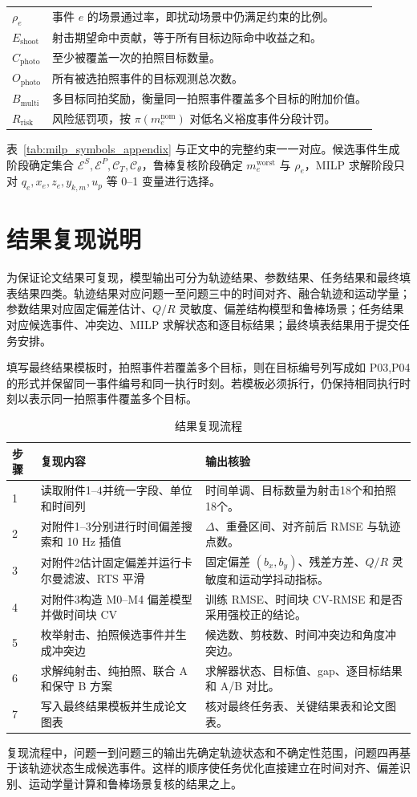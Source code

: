 \documentclass{cumcmthesis}
\begin{document}
\begin{longtable}{p{}p{}}
  $\rho_e$ & 事件 $e$ 的场景通过率，即扰动场景中仍满足约束的比例。\\
  $E_{\mathrm{shoot}}$ & 射击期望命中贡献，等于所有目标边际命中收益之和。\\
  $C_{\mathrm{photo}}$ & 至少被覆盖一次的拍照目标数量。\\
  $O_{\mathrm{photo}}$ & 所有被选拍照事件的目标观测总次数。\\
  $B_{\mathrm{multi}}$ & 多目标同拍奖励，衡量同一拍照事件覆盖多个目标的附加价值。\\
  $R_{\mathrm{risk}}$ & 风险惩罚项，按 $\pi(m_e^{\mathrm{nom}})$ 对低名义裕度事件分段计罚。\\
  \bottomrule
\end{longtable}

表~\ref{tab:milp_symbols_appendix} 与正文中的完整约束一一对应。候选事件生成阶段确定集合 $\mathcal E^S,\mathcal E^P,\mathcal C_T,\mathcal C_\theta$，鲁棒复核阶段确定 $m_e^{\mathrm{worst}}$ 与 $\rho_e$，MILP 求解阶段只对 $q_e,x_e,z_e,y_{k,m},u_p$ 等 0--1 变量进行选择。

\section{结果复现说明}
为保证论文结果可复现，模型输出可分为轨迹结果、参数结果、任务结果和最终填表结果四类。轨迹结果对应问题一至问题三中的时间对齐、融合轨迹和运动学量；参数结果对应固定偏差估计、$Q/R$ 灵敏度、偏差结构模型和鲁棒场景；任务结果对应候选事件、冲突边、MILP 求解状态和逐目标结果；最终填表结果用于提交任务安排。

填写最终结果模板时，拍照事件若覆盖多个目标，则在目标编号列写成如 P03,P04 的形式并保留同一事件编号和同一执行时刻。若模板必须拆行，仍保持相同执行时刻以表示同一拍照事件覆盖多个目标。

\begin{table}[H]
  \centering
  \caption{结果复现流程}
  \label{tab:reproduce_steps}
  \small
  \begin{tabular}{p{}p{}p{}}
    \toprule
    步骤 & 复现内容 & 输出核验\\
    \midrule
    1 & 读取附件1--4并统一字段、单位和时间列 & 时间单调、目标数量为射击18个和拍照18个。\\
    2 & 对附件1--3分别进行时间偏差搜索和 10 Hz 插值 & $\Delta$、重叠区间、对齐前后 RMSE 与轨迹点数。\\
    3 & 对附件2估计固定偏差并运行卡尔曼滤波、RTS 平滑 & 固定偏差 $(b_x,b_y)$、残差方差、$Q/R$ 灵敏度和运动学抖动指标。\\
    4 & 对附件3构造 M0--M4 偏差模型并做时间块 CV & 训练 RMSE、时间块 CV-RMSE 和是否采用强校正的结论。\\
    5 & 枚举射击、拍照候选事件并生成冲突边 & 候选数、剪枝数、时间冲突边和角度冲突边。\\
    6 & 求解纯射击、纯拍照、联合 A 和保守 B 方案 & 求解器状态、目标值、gap、逐目标结果和 A/B 对比。\\
    7 & 写入最终结果模板并生成论文图表 & 核对最终任务表、关键结果表和论文图表。\\
    \bottomrule
  \end{tabular}
\end{table}

复现流程中，问题一到问题三的输出先确定轨迹状态和不确定性范围，问题四再基于该轨迹状态生成候选事件。这样的顺序使任务优化直接建立在时间对齐、偏差识别、运动学量计算和鲁棒场景复核的结果之上。
\end{document}
